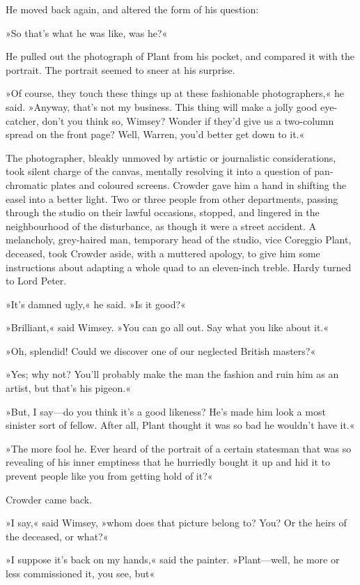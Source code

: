 He moved back again, and altered the form of his question:

»So that's what he was like, was he?«

He pulled out the photograph of Plant from his pocket, and compared it with the portrait. The portrait seemed to sneer at his surprise.

»Of course, they touch these things up at these fashionable photographers,« he said. »Anyway, that's not my business. This thing will make a jolly good eye-catcher, don't you think so, Wimsey? Wonder if they'd give us a two-column spread on the front page? Well, Warren, you'd better get down to it.«

The photographer, bleakly unmoved by artistic or journalistic considerations, took silent charge of the canvas, mentally resolving it into a question of pan-chromatic plates and coloured screens. Crowder gave him a hand in shifting the easel into a better light. Two or three people from other departments, passing through the studio on their lawful occasions, stopped, and lingered in the neighbourhood of the disturbance, as though it were a street accident. A melancholy, grey-haired man, temporary head of the studio, vice Coreggio Plant, deceased, took Crowder aside, with a muttered apology, to give him some instructions about adapting a whole quad to an eleven-inch treble. Hardy turned to Lord Peter.

»It's damned ugly,« he said. »Is it good?«

»Brilliant,« said Wimsey. »You can go all out. Say what you like about it.«

»Oh, splendid! Could we discover one of our neglected British masters?«

»Yes; why not? You'll probably make the man the fashion and ruin him as an artist, but that's his pigeon.«

»But, I say—do you think it's a good likeness? He's made him look a most sinister sort of fellow. After all, Plant thought it was so bad he wouldn't have it.«

»The more fool he. Ever heard of the portrait of a certain statesman that was so revealing of his inner emptiness that he hurriedly bought it up and hid it to prevent people like you from getting hold of it?«

Crowder came back.

»I say,« said Wimsey, »whom does that picture belong to? You? Or the heirs of the deceased, or what?«

»I suppose it's back on my hands,« said the painter. »Plant—well, he more or less commissioned it, you see, but\longdash«


